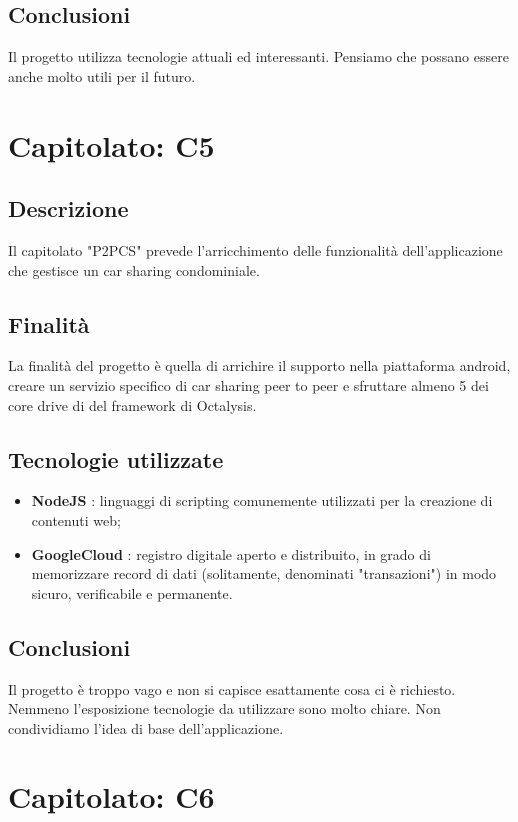         \subsection{Conclusioni}
            Il progetto utilizza tecnologie attuali ed interessanti. Pensiamo che possano essere anche molto utili per il futuro.
			
\newpage
    \section{Capitolato: C5}
        \subsection{Descrizione}
            Il capitolato "P2PCS" prevede l'arricchimento delle funzionalità dell'applicazione che gestisce un car sharing condominiale.
        \subsection{Finalità}
            La finalità del progetto è quella di arrichire il supporto nella piattaforma android, creare un servizio specifico di car sharing peer to peer e sfruttare almeno 5 dei core drive di del framework di Octalysis.
        \subsection{Tecnologie utilizzate}
    \begin{itemize}
	   \item \textbf{NodeJS} : linguaggi di scripting comunemente utilizzati per la creazione di contenuti web;
	   \item \textbf{GoogleCloud} : registro digitale aperto e distribuito, in grado di memorizzare record di dati (solitamente, denominati "transazioni") in modo sicuro, verificabile e permanente.
     \end{itemize}
        \subsection{Conclusioni}
            Il progetto è troppo vago e non si capisce esattamente cosa ci è richiesto. Nemmeno l'esposizione tecnologie da utilizzare sono molto chiare.
            Non condividiamo l'idea di base dell'applicazione. 
\newpage

\newpage
    \section{Capitolato: C6}
